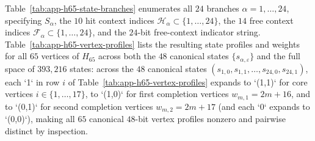 \documentclass[
  aps,
  pra,
  reprint,
  superscriptaddress,
  amsmath,
  amssymb,
  nofootinbib,
  floatfix
]{revtex4-2}
\theoremstyle{definition}
\theoremstyle{remark}
\begin{document}
Table~\ref{tab:app-h65-state-branches} enumerates all $24$ branches $\alpha=1,\ldots,24$, specifying $S_\alpha$, the $10$ hit context indices $\mathcal{H}_\alpha\subset\{1,\ldots,24\}$, the $14$ free context indices $\mathcal{F}_\alpha\subset\{1,\ldots,24\}$, and the $24$-bit free-context indicator string. Table~\ref{tab:app-h65-vertex-profiles} lists the resulting state profiles and weights for all $65$ vertices of $H_{65}$ across both the $48$ canonical states $\{s_{\alpha,\varepsilon}\}$ and the full space of $393{,}216$ states: across the $48$ canonical states $(s_{1,0},s_{1,1},\ldots,s_{24,0},s_{24,1})$, each `1` in row $i$ of Table~\ref{tab:app-h65-vertex-profiles} expands to `(1,1)` for core vertices $i\in\{1,\ldots,17\}$, to `(1,0)` for first completion vertices $w_{m,1}=2m+16$, and to `(0,1)` for second completion vertices $w_{m,2}=2m+17$ (and each `0` expands to `(0,0)`), making all $65$ canonical $48$-bit vertex profiles nonzero and pairwise distinct by inspection.
\end{document}
